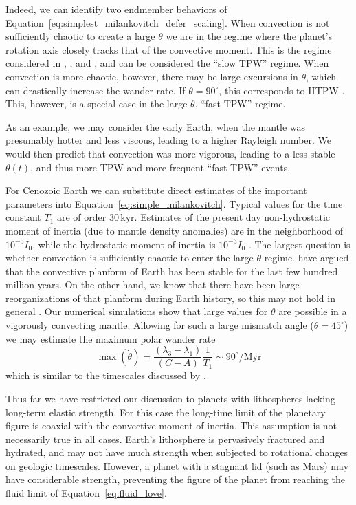 \documentclass[extra,mreferee]{gji}
\begin{document}
Indeed, we can identify two endmember behaviors of Equation~\eqref{eq:simplest_milankovitch_defer_scaling}.
When convection is not sufficiently chaotic to create a large $\theta$ we are in the regime where the planet's rotation axis closely tracks that of the convective moment.
This is the regime considered in \citet{steinberger1997changes}, \citet{roberts2007cause}, and \citet{zhong2007supercontinent}, and can be considered the ``slow TPW'' regime.
When convection is more chaotic, however, there may be large excursions in $\theta$, which can drastically increase the wander rate.  
If $\theta=90^\circ$, this corresponds to IITPW \citep{kirschvink1997evidence}.  
This, however, is a special case in the large $\theta$, ``fast TPW'' regime.

As an example, we may consider the early Earth, when the mantle was presumably hotter and less viscous, leading to a 
higher Rayleigh number. We would then predict that convection was more vigorous, leading to 
a less stable $\theta(t)$, and thus more TPW and more frequent ``fast TPW'' events.

For Cenozoic Earth we can substitute direct estimates of the important parameters into Equation~\eqref{eq:simple_milankovitch}.
Typical values for the time constant $T_1$ are of order $30 \, \mathrm{kyr}$.
Estimates of the present day non-hydrostatic moment of inertia (due to mantle density anomalies)
are in the neighborhood of $10^{-5} I_0$, while the hydrostatic moment of inertia is $10^{-3} I_0$ \citep{chambat2001mean}.
The largest question is whether convection is sufficiently chaotic to enter the large $\theta$ regime. 
\citet{richards1997explanation} have argued that the convective planform of Earth has been stable for the last
few hundred million years. On the other hand, we know that there have been large reorganizations of that planform 
during Earth history, so this may not hold in general \citep{evans2003true}.
Our numerical simulations show that large values for $\theta$ are possible in a vigorously convecting mantle.
Allowing for such a large mismatch angle ($\theta = 45^\circ$) we may estimate the maximum polar wander rate
\begin{equation}
\max ( \dot{\theta} ) = \frac{(\lambda_3-\lambda_1)}{(C-A)}\frac{1}{T_1} \sim 90^\circ / \mathrm{Myr}
\end{equation}
which is similar to the timescales discussed by \citet{cambiotti2011new}.

Thus far we have restricted our discussion to planets with lithospheres lacking long-term elastic strength.
For this case the long-time limit of the planetary figure is coaxial with the convective 
moment of inertia. This assumption is not necessarily true in all cases.
Earth's lithosphere is pervasively fractured and hydrated, and may not have much strength when subjected to rotational changes on geologic timescales.
However, a planet with a stagnant lid (such as Mars) may have considerable strength, preventing the figure of the planet 
from reaching the fluid limit of Equation~\eqref{eq:fluid_love}.
\end{document}
